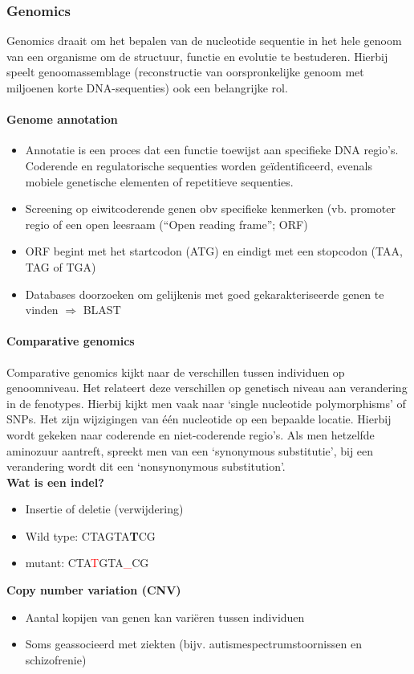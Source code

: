 \documentclass[a4paper,kul]{kulakarticle} %
\begin{document}
\subsubsection{Genomics}
Genomics draait om het bepalen van de nucleotide sequentie in het hele genoom van een organisme om de structuur, functie en evolutie te bestuderen. Hierbij speelt genoomassemblage (reconstructie van oorspronkelijke genoom met miljoenen korte DNA-sequenties) ook een belangrijke rol.
\paragraph{Genome annotation}
\begin{itemize}
	\item Annotatie is een proces dat een functie toewijst aan specifieke DNA
	regio’s. Coderende en regulatorische sequenties worden geïdentificeerd,
	evenals mobiele genetische elementen of repetitieve sequenties.
	\item Screening op eiwitcoderende genen obv specifieke kenmerken (vb.
	promoter regio of een open leesraam (“Open reading frame”; ORF)
	\item ORF begint met het startcodon (ATG) en eindigt met een stopcodon
	(TAA, TAG of TGA)
	\item Databases doorzoeken om gelijkenis met goed gekarakteriseerde genen
	te vinden $\Rightarrow$ BLAST
\end{itemize}
\paragraph{Comparative genomics}
Comparative genomics kijkt naar de verschillen tussen individuen op genoomniveau. Het relateert deze verschillen op genetisch niveau aan verandering in de fenotypes. Hierbij kijkt men vaak naar `single nucleotide polymorphisms' of SNPs. Het zijn wijzigingen van één nucleotide op een bepaalde locatie. Hierbij wordt gekeken naar coderende en niet-coderende regio's. Als men hetzelfde aminozuur aantreft, spreekt men van een `synonymous substitutie', bij een verandering wordt dit een `nonsynonymous substitution'.\\
\textbf{Wat is een indel?}
\begin{itemize}
	\item Insertie of deletie (verwijdering)
	\item Wild type: CTAGTA\textbf{T}CG
	\item mutant: CTA\textcolor{red}{T}GTA\textcolor{red}{\_}CG
\end{itemize}
\textbf{Copy number variation (CNV)}
\begin{itemize}
	\item Aantal kopijen van genen kan variëren tussen individuen
	\item Soms geassocieerd met ziekten (bijv. autismespectrumstoornissen en
	schizofrenie)
\end{itemize}
\end{document}
